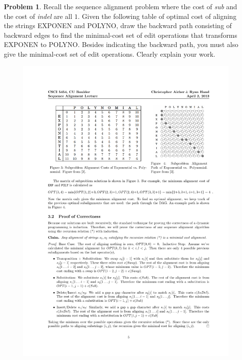 \documentclass[11pt]{article}
\theoremstyle{definition}
\theoremstyle{definition}
\newtheorem{required}{Problem}
\theoremstyle{definition}
\begin{document}
\newpage
\begin{required}
Recall the sequence alignment problem where the cost of {\em sub} and the cost of {\em indel} are all $1$. Given the following table of optimal cost of aligning the strings EXPONEN and POLYNO, draw the backward path consisting of backward edges to find the minimal-cost set of edit operations that transforms EXPONEN to POLYNO. Besides indicating the backward path, you must also give the minimal-cost set of edit operations.  Clearly explain your work. 
        \begin{figure}[h!]
        \begin{center}
        \includegraphics[scale=0.90]{exp_poly.pdf} 
        \end{center}
        \end{figure}


\end{required}
\end{document}
